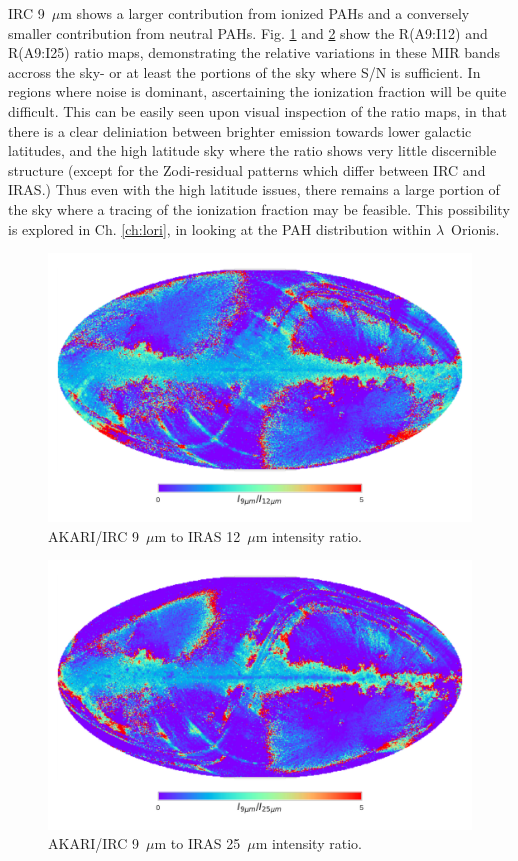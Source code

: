       IRC 9~$\mu$m shows a larger contribution from ionized PAHs and a conversely smaller contribution from neutral PAHs. Fig. \ref{fig:ratioMap_A9I12} and \ref{fig:ratioMap_A9I25} show the R(A9:I12) and R(A9:I25) ratio maps, demonstrating the relative variations in these MIR bands accross the sky- or at least the portions of the sky where S/N is sufficient. In regions where noise is dominant, ascertaining the ionization fraction will be quite difficult. This can be easily seen upon visual inspection of the ratio maps, in that there is a clear deliniation between brighter emission towards lower galactic latitudes, and the high latitude sky where the ratio shows very little discernible structure (except for the Zodi-residual patterns which differ between IRC and IRAS.) Thus even with the high latitude issues, there remains a large portion of the sky where a tracing of the ionization fraction may be feasible. This possibility is explored in Ch. \ref{ch:lori}, in looking at the PAH distribution within $\lambda$~Orionis.
       \begin{figure}
         \centering
         \includegraphics[width=\textwidth]{../Plots/ch_datasources/ratioMap_A9I12.pdf}
         \caption{ AKARI/IRC 9~$\mu$m to IRAS 12~$\mu$m intensity ratio.}
         \label{fig:ratioMap_A9I12}
       \end{figure}
       \begin{figure}
         \centering
         \includegraphics[width=\textwidth]{../Plots/ch_datasources/ratioMap_A9I25.pdf}
         \caption{ AKARI/IRC 9~$\mu$m to IRAS 25~$\mu$m intensity ratio.}
         \label{fig:ratioMap_A9I25}
       \end{figure}

